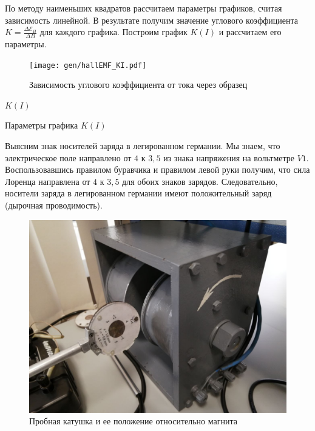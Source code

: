 \documentclass[12pt,a4paper]{article}
\begin{document}
	По методу наименьших квадратов рассчитаем параметры графиков, считая зависимость линейной. В результате получим значение углового коэффициента $K = \frac{\Delta \mathcal{E}_H}{\Delta B}$ для каждого графика. Построим график $K(I)$ и рассчитаем его параметры.
	
	\begin{figure}[H]
		\texttt{[image: gen/hallEMF\_KI.pdf]}
		\caption{Зависимость углового коэффициента от тока через образец}
	\end{figure}
	
	\begin{table}[h]
		\caption{$K(I)$}
		
	\end{table}
	
	\begin{table}[h]
		\caption{Параметры графика $K(I)$}
		
	\end{table}

	Выясним знак носителей заряда в легированном германии. Мы знаем, что электрическое поле направлено от $4$ к $3,5$ из знака напряжения на вольтметре $V1$. Воспользовавшись правилом буравчика и правилом левой руки получим, что сила Лоренца направлена от $4$ к $3,5$ для обоих знаков зарядов. Следовательно, носители заряда в легированном германии имеют положительный заряд (дырочная проводимость).
	
	\begin{figure}[H]
		\includegraphics[scale = 0.25]{res/probe_coil.jpg}
		\caption{Пробная катушка и ее положение относительно магнита}
	\end{figure}
	
\end{document}
